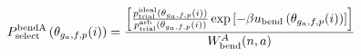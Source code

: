 \documentclass[12pt]{article}
\begin{document}
\begin{displaymath}
P_{\rm select}^{\rm bend A}\left(\theta_{g_a,f,p}(i)\right) = 
{{
\left[
{{p_{\rm trial}^{\rm ideal}\left(\theta_{g_a,f,p}(i)\right)}\over{ p_{\rm trial}^{\rm arb}\left(\theta_{g_a,f,p}(i)\right)}}
\exp\left[-\beta u_{\rm bend}\left(\theta_{g_a,f,p}(i)\right)\right]
\right]
}
\over
{
W_{\rm bend}^{A}(n,a)
}}
\end{displaymath}
\end{document}

